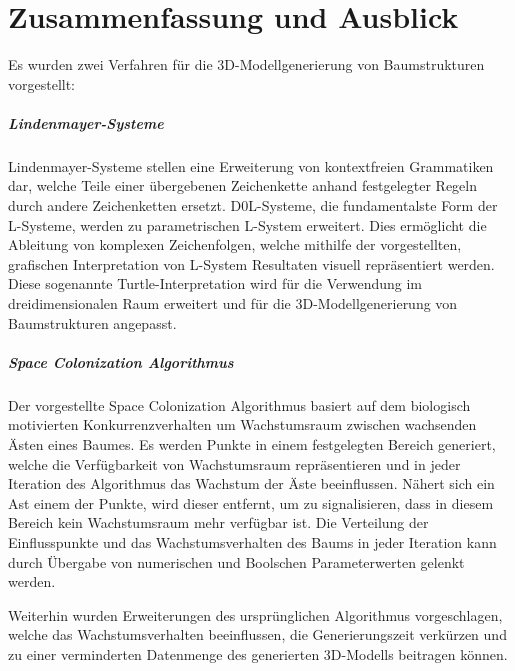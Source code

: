 \chapter{Zusammenfassung und Ausblick}

Es wurden zwei Verfahren für die 3D-Modellgenerierung von Baumstrukturen vorgestellt:

\paragraph{Lindenmayer-Systeme}

Lindenmayer-Systeme stellen eine Erweiterung von kontextfreien Grammatiken dar, welche Teile einer übergebenen Zeichenkette anhand festgelegter Regeln durch andere Zeichenketten ersetzt. D0L-Systeme, die fundamentalste Form der L-Systeme, werden zu parametrischen L-System erweitert. \cite[S.3]{ABOP:04} Dies ermöglicht die Ableitung von komplexen Zeichenfolgen, welche mithilfe der vorgestellten, grafischen Interpretation von L-System Resultaten visuell repräsentiert werden. Diese sogenannte Turtle-Interpretation wird für die Verwendung im dreidimensionalen Raum erweitert und für die 3D-Modellgenerierung von Baumstrukturen angepasst. \cite[S.7, 18f, 21ff, 51ff]{ABOP:04}

\paragraph{Space Colonization Algorithmus}

Der vorgestellte Space Colonization Algorithmus basiert auf dem biologisch motivierten Konkurrenzverhalten um Wachstumsraum zwischen wachsenden Ästen eines Baumes. Es werden Punkte in einem festgelegten Bereich generiert, welche die Verfügbarkeit von Wachstumsraum repräsentieren und in jeder Iteration des Algorithmus das Wachstum der Äste beeinflussen. Nähert sich ein Ast einem der Punkte, wird dieser entfernt, um zu signalisieren, dass in diesem Bereich kein Wachstumsraum mehr verfügbar ist. \cite[S.2f]{SpaceColonizationAlgorithm:07} Die Verteilung der Einflusspunkte und das Wachstumsverhalten des Baums in jeder Iteration kann durch Übergabe von numerischen und Boolschen Parameterwerten gelenkt werden. \cite[S.5]{SpaceColonizationAlgorithm:07} 

Weiterhin wurden Erweiterungen des ursprünglichen Algorithmus vorgeschlagen, welche das Wachstumsverhalten beeinflussen, die Generierungszeit verkürzen und zu einer verminderten Datenmenge des generierten 3D-Modells beitragen können.

